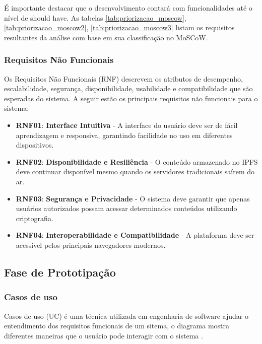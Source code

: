         É importante destacar que o desenvolvimento contará com funcionalidades até o nível de should have.
        As tabelas \ref{tab:priorizacao_moscow}, \ref{tab:priorizacao_moscow2}, \ref{tab:priorizacao_moscow3} listam os requisitos resultantes da análise com base em sua classificação no MoSCoW.

        \subsubsection{Requisitos Não Funcionais}
        Os Requisitos Não Funcionais (RNF) descrevem os atributos de desempenho, escalabilidade, segurança, disponibilidade, usabilidade e compatibilidade que são esperadas do sistema. A seguir estão os principais requisitos não funcionais para o sistema:

        \begin{itemize}
            \item \textbf{RNF01}: \textbf{Interface Intuitiva} - A interface do usuário deve ser de fácil aprendizagem e responsiva, garantindo facilidade no uso em diferentes dispositivos.
            \item \textbf{RNF02}: \textbf{Disponibilidade e Resiliência} - O conteúdo armazenado no IPFS deve continuar disponível mesmo quando os servidores tradicionais saírem do ar.
            \item \textbf{RNF03}: \textbf{Segurança e Privacidade} - O sistema deve garantir que apenas usuários autorizados possam acessar determinados conteúdos utilizando criptografia.
            \item \textbf{RNF04}: \textbf{Interoperabilidade e Compatibilidade} - A plataforma deve ser acessível pelos principais navegadores modernos.
        \end{itemize}

    \subsection{Fase de Prototipação}

        \subsubsection{Casos de uso}
        Casos de uso (UC) é uma técnica utilizada em engenharia de software ajudar o entendimento dos requisitos funcionais de um sitema, o diagrama mostra diferentes maneiras que o usuário pode interagir com o sistema \cite{lucidchart2025}.

